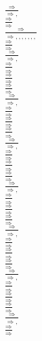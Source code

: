 \documentclass[11pt]{article}
\begin{document}
\begin{center}
\bigskip
\\$\frac{\Rightarrow }{\Rightarrow , }$
\bigskip
\\$\frac{\Rightarrow }{\Rightarrow }$
\bigskip
\\$\frac{\Rightarrow }{\Rightarrow , , , , , , , }$
\bigskip
\\$\frac{\Rightarrow }{\Rightarrow }$
\bigskip
\\$\frac{\Rightarrow }{\Rightarrow , }$
\bigskip
\\$\frac{\Rightarrow }{\Rightarrow }$
\bigskip
\\$\frac{\Rightarrow }{\Rightarrow }$
\bigskip
\\$\frac{\Rightarrow }{\Rightarrow }$
\bigskip
\\$\frac{\Rightarrow }{\Rightarrow , }$
\bigskip
\\$\frac{\Rightarrow }{\Rightarrow }$
\bigskip
\\$\frac{\Rightarrow }{\Rightarrow }$
\bigskip
\\$\frac{\Rightarrow }{\Rightarrow }$
\bigskip
\\$\frac{\Rightarrow }{\Rightarrow , }$
\bigskip
\\$\frac{\Rightarrow }{\Rightarrow }$
\bigskip
\\$\frac{\Rightarrow }{\Rightarrow }$
\bigskip
\\$\frac{\Rightarrow }{\Rightarrow }$
\bigskip
\\$\frac{\Rightarrow }{\Rightarrow , }$
\bigskip
\\$\frac{\Rightarrow }{\Rightarrow }$
\bigskip
\\$\frac{\Rightarrow }{\Rightarrow }$
\bigskip
\\$\frac{\Rightarrow }{\Rightarrow }$
\bigskip
\\$\frac{\Rightarrow }{\Rightarrow , }$
\bigskip
\\$\frac{\Rightarrow }{\Rightarrow }$
\bigskip
\\$\frac{\Rightarrow }{\Rightarrow }$
\bigskip
\\$\frac{\Rightarrow }{\Rightarrow }$
\bigskip
\\$\frac{\Rightarrow }{\Rightarrow , }$
\bigskip
\\$\frac{\Rightarrow }{\Rightarrow }$
\bigskip
\\$\frac{\Rightarrow }{\Rightarrow }$
\bigskip
\\$\frac{\Rightarrow }{\Rightarrow }$
\bigskip
\\$\frac{\Rightarrow }{\Rightarrow , }$
\bigskip
\\$\frac{\Rightarrow }{\Rightarrow }$

\end{center}
\end{document}
